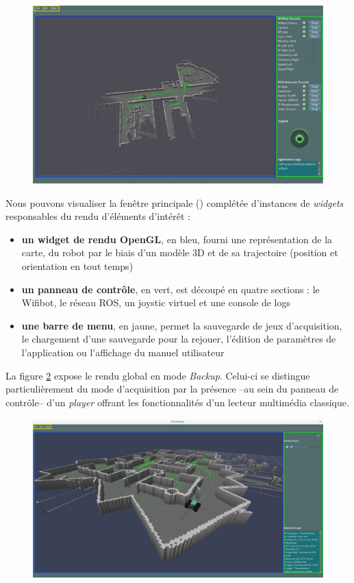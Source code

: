 \begin{figure}[h]
  \centering
    \includegraphics[width=1.\linewidth]{figures/slam-widget}  
  \label{fig:reception}
\end{figure}

Nous pouvons visualiser la fenêtre principale () complétée d'instances de \emph{widgets} responsables du rendu d'éléments d'intérêt : 
\begin{itemize}
 \item \textbf{un widget de rendu OpenGL}, en bleu, fourni une représentation de la carte, du robot par le biais d'un modèle 3D et de sa trajectoire (position et orientation en tout temps)
 \item \textbf{un panneau de contrôle}, en vert, est découpé en quatre sections : le Wifibot, le réseau ROS, un joystic virtuel et une console de logs 
 \item \textbf{une barre de menu}, en jaune, permet la sauvegarde de jeux d'acquisition, le chargement d'une sauvegarde pour la rejouer, l'édition de paramètres de l'application ou l'affichage du manuel utilisateur
\end{itemize}

La figure \ref{fig:replay} expose le rendu global en mode \emph{Backup}. 
Celui-ci se distingue particulièrement du mode d'acquisition par la présence --au sein du panneau de contrôle-- d'un \emph{player} offrant les fonctionnalités d'un lecteur multimédia classique.

\begin{figure}[h]  
  \centering
    \includegraphics[width=1.\linewidth]{figures/slam-backup}  
  \label{fig:replay}
\end{figure}

